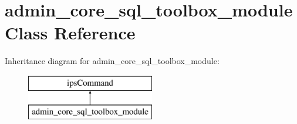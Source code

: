 \hypertarget{classadmin__core__sql__toolbox__module}{\section{admin\-\_\-core\-\_\-sql\-\_\-toolbox\-\_\-module Class Reference}
\label{classadmin__core__sql__toolbox__module}
}
Inheritance diagram for admin\-\_\-core\-\_\-sql\-\_\-toolbox\-\_\-module\-:\begin{figure}[H]
\begin{center}
\leavevmode
\includegraphics[height=2.000000cm]{classadmin__core__sql__toolbox__module}
\end{center}
\end{figure}
